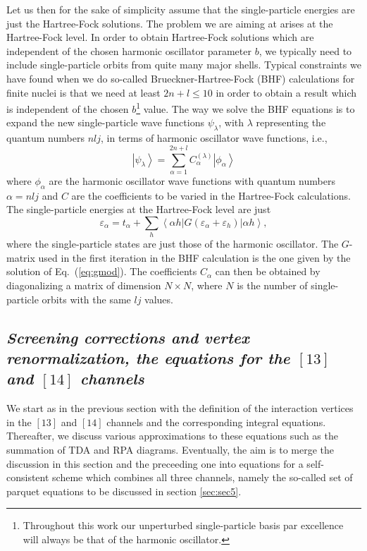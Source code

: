 \documentclass{article}
\newcommand{\bra}[1]{\left\langle #1 \right|}
\newcommand{\ket}[1]{\left| #1 \right\rangle}
\begin{document}
Let us then for the sake of simplicity assume that the
single-particle energies are just the Hartree-Fock
solutions. The problem we are aiming at arises at the
Hartree-Fock level.
In order to obtain Hartree-Fock solutions which
are independent of the chosen harmonic oscillator
parameter $b$, we typically need to include single-particle
orbits from quite many major shells.
Typical constraints we have found when we do so-called
Brueckner-Hartree-Fock (BHF) calculations for finite nuclei is that
we need at least $2n+l \leq 10$ in order to obtain
a result which is independent of the chosen
$b$\footnote{Throughout this work our unperturbed single-particle
basis par excellence will always be that of the harmonic
oscillator.} value. The way we solve the
BHF equations is to expand the new single-particle
wave functions $\psi_{\lambda}$, with $\lambda$
representing the quantum numbers $nlj$,
in terms of harmonic oscillator wave functions,
i.e.,
\begin{equation}
     \left | \psi_{\lambda}\right\rangle=
     \sum_{\alpha =1}^{2n+l}
     C_{\alpha}^{(\lambda )}\left | \phi_{\alpha}\right\rangle
     \label{eq:selfconstbasis}
\end{equation}
where $\phi_{\alpha}$ are the harmonic oscillator wave functions
with quantum numbers $\alpha=nlj$ and $C$ are the coefficients
to be varied in the Hartree-Fock calculations.
The single-particle energies at the
Hartree-Fock level are just
\begin{equation}
  \varepsilon_{\alpha}=t_{\alpha}+
   \sum_h \bra{\alpha h} G(\varepsilon_{\alpha}+
                           \varepsilon_h)
          \ket{\alpha h},
\end{equation}
where the single-particle states are just those
of the harmonic oscillator. The $G$-matrix used in the
first iteration in the BHF calculation is the one given
by the solution of Eq.\ (\ref{eq:gmod}).
The coefficients
$C_{\alpha}$ can then be obtained by diagonalizing
a matrix of dimension $N\times N$, where $N$ is the number
of single-particle orbits with the same $lj$ values.

\subsection{\it Screening corrections and vertex renormalization, the equations
for the $[13]$ and  $[14]$ channels}
\label{subsec:sec4}

We start as in the previous section with the definition of the interaction
vertices in the $[13]$ and $[14]$ channels and the corresponding
integral equations. Thereafter, we discuss various approximations
to these equations such as the summation of TDA and RPA diagrams.
Eventually, the aim is to merge the discussion in this section and
the preceeding one into equations for a self-consistent scheme which combines
all three channels, namely the so-called set of parquet equations to
be discussed in section \ref{sec:sec5}.
\end{document}
